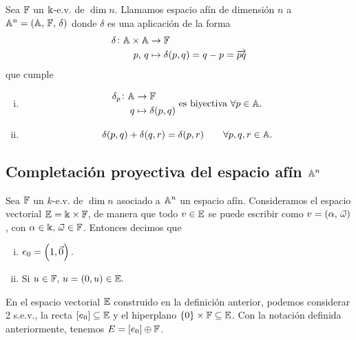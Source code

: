 \begin{obs}
  Sea $\mathbb{F}$ un $\Bbbk$-e.v. de $\dim n$. Llamamos espacio afín de dimensión $n$ a
  $\mathbb{A}^n = \left( \mathbb{A},\, \mathbb{F},\, \delta \right)$ donde $\delta$ es una aplicación de la forma
  \[
    \begin{aligned}
      \delta \colon \mathbb{A} \times \mathbb{A} & \to \mathbb{F}  \\
      p,\, q &\mapsto \delta (p, q) = q - p = \overrightarrow{pq}
    \end{aligned}
  \]
  que cumple
  \begin{enumerate}[i)]
    \item 
      \[
        \begin{aligned}
          \delta_p \colon \mathbb{A} & \to \mathbb{F}  \\
          q &\mapsto \delta (p, q)
        \end{aligned}
        \text{ es biyectiva } \forall p \in \mathbb{A}.
      \]
    \item \[\delta(p, q) + \delta(q, r) = \delta(p,r) \qquad \forall p, q, r \in \mathbb{A}.\]
  \end{enumerate}
\end{obs}

\subsection{Completación proyectiva del espacio afín $\mathbb{A}^n$}

\begin{defi*}
  Sea $\mathbb{F}$ un $k$-e.v. de $\dim n$ asociado a $\mathbb{A}^n$ un espacio afín. Consideramos
  el espacio vectorial $\mathbb{E} = \Bbbk \times \mathbb{F}$, de manera que todo $v \in \mathbb{E}$ se puede 
  escribir como $v = \left( \alpha, \, \vec{\omega} \right)$, con $\alpha \in \Bbbk, \, 
  \vec{\omega} \in \mathbb{F}$. Entonces decimos que
  \begin{enumerate}[i)]
    \item $e_0 = \left(1, \vec{0}\right).$
    \item Si $u \in \mathbb{F}, \, u = \left( 0, u \right) \in \mathbb{E}.$
  \end{enumerate}
\end{defi*}

\begin{obs}
  En el espacio vectorial $\mathbb{E}$ construido en la definición anterior,
  podemos considerar 2 s.e.v., la recta $[e_0] \subseteq \mathbb{E}$ y el hiperplano
  $\{0\} \times \mathbb{F} \subseteq \mathbb{E}$. Con la notación definida anteriormente,
  tenemos $E = [e_0] \oplus \mathbb{F}$.
\end{obs}

